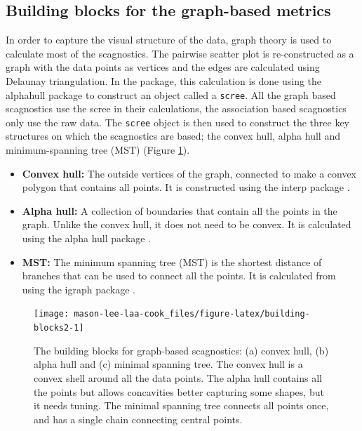 \subsection{Building blocks for the graph-based metrics}\label{building-blocks-for-the-graph-based-metrics}

In order to capture the visual structure of the data, graph theory is used to calculate most of the scagnostics. The pairwise scatter plot is re-constructed as a graph with the data points as vertices and the edges are calculated using Delaunay triangulation. In the package, this calculation is done using the alphahull package \citep{alphahull} to construct an object called a \texttt{scree}. All the graph based scagnostics use the scree in their calculations, the association based scagnostics only use the raw data. The \texttt{scree} object is then used to construct the three key structures on which the scagnostics are based; the convex hull, alpha hull and minimum-spanning tree (MST) (Figure \ref{fig:building-blocks2}).

\begin{itemize}
\item
  \textbf{Convex hull:} The outside vertices of the graph, connected to make a convex polygon that contains all points. It is constructed using the interp package \citep{interp}.
\item
  \textbf{Alpha hull:} A collection of boundaries that contain all the points in the graph. Unlike the convex hull, it does not need to be convex. It is calculated using the alpha hull package \citep{alphahull}.
\item
  \textbf{MST:} The minimum spanning tree (MST) is the shortest distance of branches that can be used to connect all the points. It is calculated from using the igraph package \citep{igraph}.
\end{itemize}

\begin{figure}
\texttt{[image: mason-lee-laa-cook\_files/figure-latex/building-blocks2-1]} \caption{The building blocks for graph-based scagnostics: (a) convex hull, (b) alpha hull and (c) minimal spanning tree. The convex hull is a convex shell around all the data points. The alpha hull contains all the points but allows concavities better capturing some shapes, but it needs tuning. The minimal spanning tree connects all points once, and has a single chain connecting central points.}\label{fig:building-blocks2}
\end{figure}

